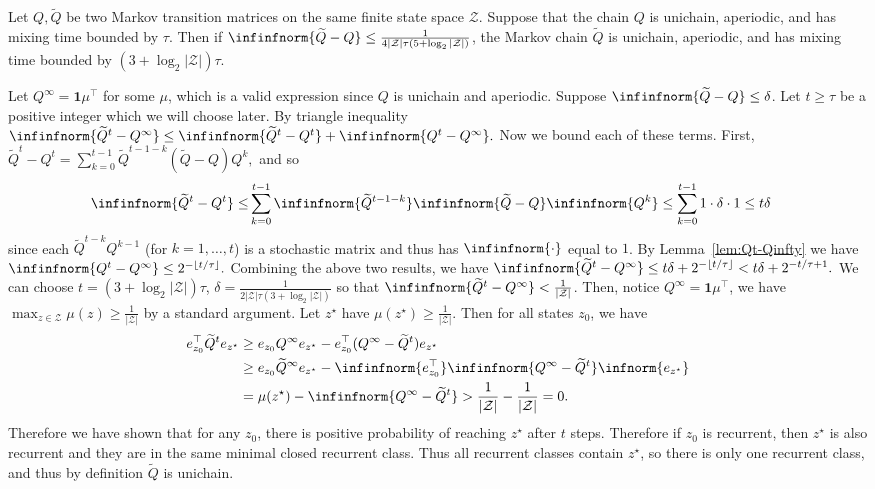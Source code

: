 \documentclass[mnsc,nonblindrev]{informs3}
\newcommand{\one}{\mathbf{1}}
\newcommand{\qtilde}{\widetilde{Q}}
\begin{document}
\begin{APPENDICES}
\begin{lemma}
    \label{lem:mixing_time_pert_bound}
    Let $Q, \widetilde{Q}$ be two Markov transition matrices on the same finite state space $\mathcal Z$. Suppose that the chain $Q$ is unichain, aperiodic, and has mixing time bounded by $\tau$. Then if $\infinfnorm{\widetilde{Q} - Q} \leq \frac{1}{4|\mathcal Z|\tau (5 + \log_2 |\mathcal Z|)}$,
    the Markov chain $\widetilde{Q}$ is unichain, aperiodic, and has mixing time bounded by $(3 + \log_2 |\mathcal Z|) \tau$.
\end{lemma}
    Let $Q^\infty = \one \mu^\top$ for some $\mu$, which is a valid expression since $Q$ is unichain and aperiodic. Suppose $\infinfnorm{\widetilde{Q} - Q} \leq\delta$. Let $t\ge\tau$ be a positive integer which we will choose later.
    By triangle inequality
    $
        \infinfnorm{\qtilde^t - Q^\infty}  
        \leq \infinfnorm{\qtilde^t - Q^t} + \infinfnorm{Q^t - Q^\infty} .
    $
    Now we bound each of these terms. First,
    $
    \qtilde^t - Q^t=\sum_{k=0}^{t-1}\qtilde^{t-1-k}(\qtilde-Q)Q^k,
    $
    and so
    \begin{align*}
        \infinfnorm{\qtilde^t - Q^t} 
        \le & \sum_{k=0}^{t-1}\infinfnorm{\qtilde^{t-1-k}}\infinfnorm{\qtilde-Q}\infinfnorm{Q^k} 
        \leq  \sum_{k=0}^{t-1}1\cdot\delta\cdot 1 
        \leq   t \delta
    \end{align*}
    since each $\qtilde^{t-k} Q^{k-1}$ (for $k = 1, \dots, t$) is a stochastic matrix and thus has $\infinfnorm{\cdot}$ equal to $1$. 
    By Lemma~\ref{lem:Qt-Qinfty} we have
$
    \infinfnorm{Q^t - Q^\infty}\le2^{-\lfloor t/\tau\rfloor}.
$
Combining the above two results, we have
    $
        \infinfnorm{\qtilde^t- Q^\infty}\leq t \delta + 2^{-\lfloor t/\tau\rfloor}< t \delta + 2^{- t/\tau+1}.
    $
    We can choose $t=(3+\log_2 |\mathcal Z|)\tau$, $\delta=\frac{1}{2|\mathcal Z|\tau(3+\log_2|\mathcal Z|)}$ so that $\infinfnorm{\qtilde^t - Q^\infty} < \frac{1}{|\mathcal Z|}$. Then, notice $Q^\infty = \one \mu^\top$, we have $\max_{z\in\mathcal Z} \mu(z) \geq \frac{1}{|\mathcal Z|}$ by a standard argument. Let $z^\star$ have $\mu(z^\star) \geq \frac{1}{|\mathcal Z|}$. Then for all states $z_0$, we have
    \begin{align*}
        e_{z_0}^\top \qtilde^{t} e_{z^\star} &\geq e_{z_0} Q^\infty e_{z^\star} - e_{z_0}^\top (Q^\infty - \qtilde^{t})e_{z^\star} \\
        & \geq e_{z_0} \qtilde^\infty e_{z^\star} - \infinfnorm{e_{z_0}^\top} \infinfnorm{Q^\infty - \qtilde^{t}} \infnorm{e_{z^\star}} \\
        &= \mu(z^\star) - \infinfnorm{Q^\infty - \qtilde^{t}} 
         > \frac{1}{|\mathcal Z|} - \frac{1}{|\mathcal Z|} = 0.
    \end{align*}
    Therefore we have shown that for any $z_0$, there is positive probability of reaching $z^\star$ after $t$ steps. Therefore if $z_0$ is recurrent, then $z^\star$ is also recurrent and they are in the same minimal closed recurrent class. Thus all recurrent classes contain $z^\star$, so there is only one recurrent class, and thus by definition $\qtilde$ is unichain.



\end{APPENDICES}
\end{document}

